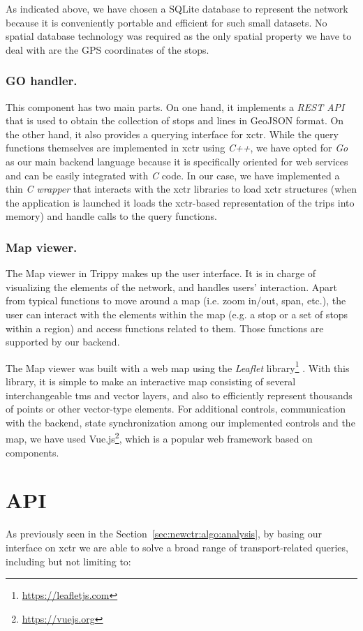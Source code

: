     As indicated above, we have chosen  a SQLite database to represent the network because it is conveniently portable and efficient for such small datasets. No spatial database technology was required as the only spatial property we have to deal with are the GPS coordinates of the  stops.
    
    \subsubsection{\bf GO handler.}
    This component has two main parts. On one hand, it implements a {\em REST API} that is used to obtain the collection of stops and lines in GeoJSON format. On the other hand, it also provides a querying interface for \gls{xctr}. While the query functions themselves are implemented in \gls{xctr} using {\em C++}, we have opted for {\em Go} as our main backend language because it is specifically oriented for web services and can be easily integrated with {\em C} code. In our case, we have implemented a thin {\em C wrapper} that interacts with the \gls{xctr} libraries to load \gls{xctr} structures (when the application is launched it loads the \gls{xctr}-based representation of the trips into memory) and handle calls to the query functions.
    
    \subsubsection{\bf Map viewer.}
    The Map viewer in Trippy makes up the user interface. It is in charge of visualizing the elements of the network, and handles users’ interaction. Apart from typical functions to move around a map (i.e. zoom in/out, span, etc.), the user can interact with the elements within the map (e.g. a stop or a set of stops within a region) and access functions related to them. Those functions are supported by our backend.
    
    The Map viewer was built with a web map using the {\em Leaflet} library\footnote{\url{https://leafletjs.com}} . With this library, it is simple to make an interactive map consisting of several interchangeable \gls{tms} and vector layers, and also to efficiently represent thousands of points or other vector-type elements.
    For additional controls, communication with the backend, state synchronization among our implemented controls and the map, we have used Vue.js\footnote{\url{https://vuejs.org}}, which is a popular web framework based on components.

	
	\section{API}
	\label{sec:api}
    As previously seen in the Section~\ref{sec:newctr:algo:analysis}, by basing our interface on \gls{xctr} we are able to solve a broad range of transport-related queries, including but not limiting to:


